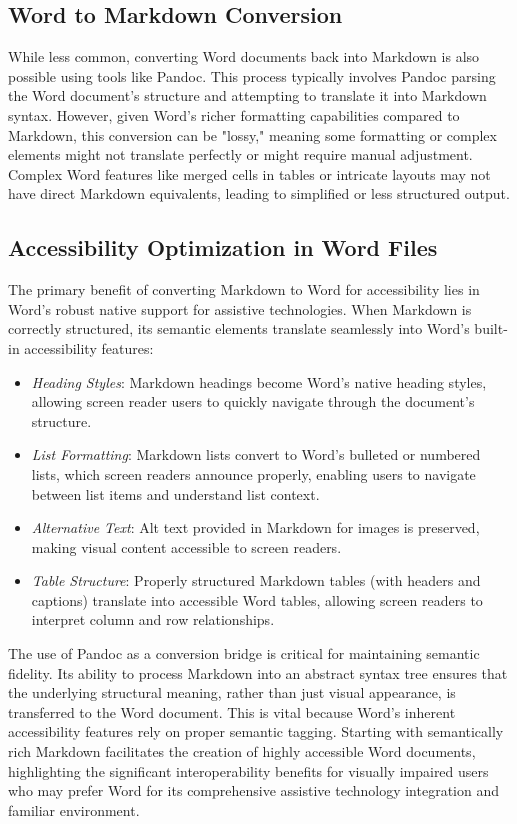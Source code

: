 \subsection{Word to Markdown Conversion}
While less common, converting Word documents back into Markdown is also possible using tools like Pandoc. This process typically involves Pandoc parsing the Word document's structure and attempting to translate it into Markdown syntax. However, given Word's richer formatting capabilities compared to Markdown, this conversion can be "lossy," meaning some formatting or complex elements might not translate perfectly or might require manual adjustment. \cite{PandocManual} Complex Word features like merged cells in tables or intricate layouts may not have direct Markdown equivalents, leading to simplified or less structured output.

\subsection{Accessibility Optimization in Word Files}
The primary benefit of converting Markdown to Word for accessibility lies in Word's robust native support for assistive technologies. When Markdown is correctly structured, its semantic elements translate seamlessly into Word's built-in accessibility features:
\begin{itemize}
    \item \emph{Heading Styles}: Markdown headings become Word's native heading styles, allowing screen reader users to quickly navigate through the document's structure. \cite{DSU, CreateUW}
    \item \emph{List Formatting}: Markdown lists convert to Word's bulleted or numbered lists, which screen readers announce properly, enabling users to navigate between list items and understand list context. \cite{DSU}
    \item \emph{Alternative Text}: Alt text provided in Markdown for images is preserved, making visual content accessible to screen readers. \cite{DSU}
    \item \emph{Table Structure}: Properly structured Markdown tables (with headers and captions) translate into accessible Word tables, allowing screen readers to interpret column and row relationships. \cite{DSU}
\end{itemize}
The use of Pandoc as a conversion bridge is critical for maintaining semantic fidelity. Its ability to process Markdown into an abstract syntax tree ensures that the underlying structural meaning, rather than just visual appearance, is transferred to the Word document. This is vital because Word's inherent accessibility features rely on proper semantic tagging. Starting with semantically rich Markdown facilitates the creation of highly accessible Word documents, highlighting the significant interoperability benefits for visually impaired users who may prefer Word for its comprehensive assistive technology integration and familiar environment.

